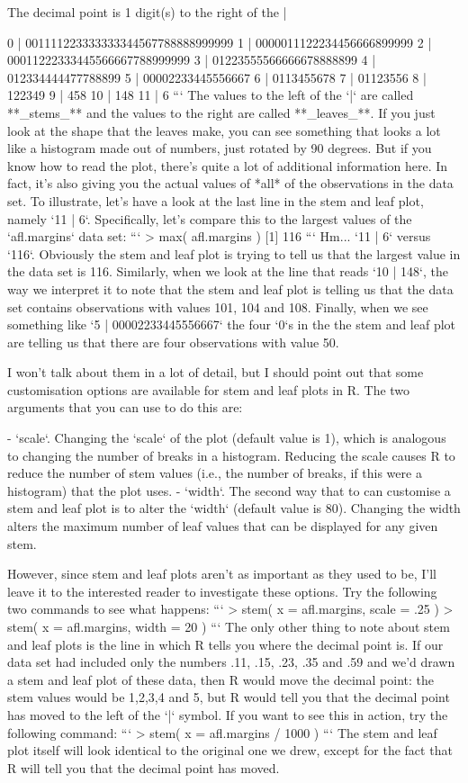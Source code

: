   The decimal point is 1 digit(s) to the right of the |

   0 | 001111223333333344567788888999999
   1 | 0000011122234456666899999
   2 | 00011222333445566667788999999
   3 | 01223555566666678888899
   4 | 012334444477788899
   5 | 00002233445556667
   6 | 0113455678
   7 | 01123556
   8 | 122349
   9 | 458
  10 | 148
  11 | 6
```
The values to the left of the `|` are called **_stems_** and the values to the right are called **_leaves_**. If you just look at the shape that the leaves make, you can see something that looks a lot like a histogram made out of numbers, just rotated by 90 degrees. But if you know how to read the plot, there's  quite a lot of additional information here. In fact, it's also giving you the actual values of *all* of the observations in the data set. To illustrate, let's have a look at the last line in the stem and leaf plot, namely `11 | 6`. Specifically, let's compare this to the largest values of the `afl.margins` data set:
```
> max( afl.margins )
[1] 116
```
Hm... `11 | 6` versus `116`. Obviously the stem and leaf plot is trying to tell us that the largest value in the data set is 116. Similarly, when we look at the line that reads `10 | 148`, the way we interpret it to note that the stem and leaf plot is telling us that the data set contains observations with values 101, 104 and 108. Finally, when we see something like 
`5 | 00002233445556667`
the four `0`s in the the stem and leaf plot are telling us that there are four observations with value 50. 


I won't talk about them in a lot of detail, but I should point out that some customisation options are available for stem and leaf plots in R. The two arguments that you can use to do this are:

- `scale`. Changing the `scale` of the plot (default value is 1), which is analogous to changing the number of breaks in a histogram. Reducing the scale causes R to reduce the number of stem values (i.e., the number of breaks, if this were a histogram) that the plot uses. 
- `width`. The second way that to can customise a stem and leaf plot is to alter the `width` (default value is 80). Changing the width alters the maximum number of leaf values that can be displayed for any given stem. 

However, since stem and leaf plots aren't as important as they used to be, I'll leave it to the interested reader to investigate these options. Try the following two commands to see what happens:
```
> stem( x = afl.margins, scale = .25 )
> stem( x = afl.margins, width = 20 )
```
The only other thing to note about stem and leaf plots is the line in which R tells you where the decimal point is. If our data set had included only the numbers .11, .15, .23, .35 and .59 and we'd drawn a stem and leaf plot of these data, then R would move the decimal point: the stem values would be 1,2,3,4 and 5, but R would tell you that the decimal point has moved to the left of the `|` symbol. If you want to see this in action, try the following command:
```
> stem( x = afl.margins / 1000 )
```
The stem and leaf plot itself will look identical to the original one we drew, except for the fact that R will tell you that the decimal point has moved.

